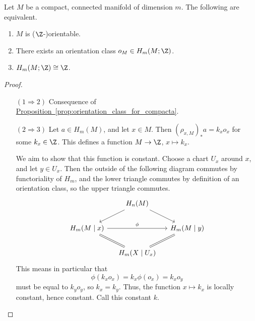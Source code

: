 \documentclass[main.tex]{subfiles}
\begin{document}
\begin{theorem}
  Let \(M\) be a compact, connected manifold of dimension \(m\). The following are equivalent.
  \begin{enumerate}
    \item \(M\) is (\(\Z\)-)orientable.

    \item There exists an orientation class \(o_{M} \in H_{m}(M; \Z)\).

    \item \(H_{m}(M; \Z) \cong \Z\).
  \end{enumerate}
\end{theorem}
\begin{proof}
  \leavevmode
  \begin{enumerate}[leftmargin=4em]
    \item[\((1 \Rightarrow 2)\)] Consequence of \hyperref[prop:orientation_class_for_compacta]{Proposition~\ref*{prop:orientation_class_for_compacta}}.

    \item[\((2 \Rightarrow 3)\)] Let \(a \in H_{m}(M)\), and let \(x \in M\). Then \((\rho_{x, M})_{*}a = k_{x} o_{x}\) for some \(k_{x} \in \Z\). This defines a function \(M \to \Z\), \(x \mapsto k_{x}\).

      We aim to show that this function is constant. Choose a chart \(U_{x}\) around \(x\), and let \(y \in U_{x}\). Then the outside of the following diagram commutes by functoriality of \(H_{m}\), and the lower triangle commutes by definition of an orientation class, so the upper triangle commutes.
      \begin{equation*}
        \begin{tikzcd}[column sep=small]
          & H_{n}(M)
          \arrow[dr]
          \arrow[dl]
          \\
          H_{m}(M \mid x)
          \arrow[dr, equals]
          \arrow[rr, "\phi"]
          && H_{m}(M \mid y)
          \arrow[dl, equals]
          \\
          & H_{m}(X \mid U_{x})
        \end{tikzcd}
      \end{equation*}
      This means in particular that
      \begin{equation*}
        \phi(k_{x} o_{x}) = k_{x} \phi(o_{x}) = k_{x} o_{y}
      \end{equation*}
      must be equal to \(k_{y} o_{y}\), so \(k_{x} = k_{y}\). Thus, the function \(x \mapsto k_{x}\) is locally constant, hence constant. Call this constant \(k\).


\end{enumerate}
\end{proof}
\end{document}
